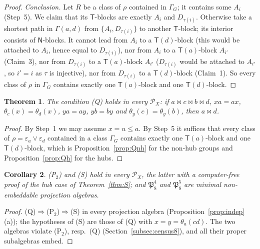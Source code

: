 \documentclass[11pt]{amsart}
\newtheorem{theorem}{Theorem}[section]
\newtheorem{corollary}[theorem]{Corollary}
\theoremstyle{definition}
\renewcommand{\P}{\mathcal{P}}
\newcommand{\T}{\mathsf{T}}
\newcommand{\N}{\mathsf{N}}
\begin{document}
\begin{proof}
\emph{Conclusion.} Let $R$ be a class of $\rho$ contained in $\Gamma_G$; it contains some $A_i$ (Step~5). We claim that its $\T$-blocks are exactly $A_i$ and $D_{\tau(i)}$. Otherwise take a shortest path in $\Gamma(a,d)$ from $\{A_i,D_{\tau(i)}\}$ to another $\T$-block; its interior consists of $\N$-blocks. It cannot lead from $A_i$ to a $\T(d)$-block (this would be attached to $A_i$, hence equal to $D_{\tau(i)}$), nor from $A_i$ to a $\T(a)$-block $A_{i'}$ (Claim~3), nor from $D_{\tau(i)}$ to a $\T(a)$-block $A_{i'}$ ($D_{\tau(i)}$ would be attached to $A_{i'}$, so $i'=i$ as $\tau$ is injective), nor from $D_{\tau(i)}$ to a $\T(d)$-block (Claim~1). So every class of $\rho$ in $\Gamma_G$ contains exactly one $\T(a)$-block and one $\T(d)$-block.
\end{proof}

\begin{theorem}\label{thm:Q}
The condition \textup{(Q)} holds in every $\P_X$: if $a\bowtie c\bowtie b\bowtie d$, $xa=ax$, $\theta_c(x)=\theta_d(x)$, $ya=ay$, $yb=by$ and $\theta_y(c)=\theta_y(b)$, then $a\bowtie d$.
\end{theorem}

\begin{proof}
By Step~1 we may assume $x=u\le a$. By Step~5 it suffices that every class of $\rho=\varepsilon_a\vee\varepsilon_d$ contained in a class $\Gamma_G$ contains exactly one $\T(a)$-block and one $\T(d)$-block, which is Proposition~\ref{prop:Qnh} for the non-hub groups and Proposition~\ref{prop:Qh} for the hubs.
\end{proof}

\begin{corollary}\label{cor:Q}
\textup{(P$_2$)} and \textup{(S)} hold in every $\P_X$, the latter with a computer-free proof of the hub case of Theorem~\ref{thm:S}; and $\mathfrak P_8^4$ and $\mathfrak P_8^5$ are minimal non-embeddable projection algebras.
\end{corollary}

\begin{proof}
(Q)$\Rightarrow$(P$_2$)$\Rightarrow$(S) in every projection algebra (Proposition~\ref{prop:indep}(a)); the hypotheses of (S) are those of (Q) with $x=y=\theta_a(cd)$. The two algebras violate (P$_2$), resp.\ (Q) (Section~\ref{subsec:census8}), and all their proper subalgebras embed.
\end{proof}
\end{document}
